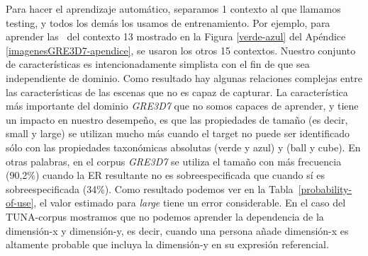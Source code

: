 Para hacer el aprendizaje autom\'atico, separamos 1 contexto al que llamamos testing, y todos los dem\'as los usamos de entrenamiento. Por ejemplo, para aprender las \puse\ del contexto 13 mostrado en la Figura \ref{verde-azul} del Ap\'endice \ref{imagenesGRE3D7-apendice}, se usaron los otros 15 contextos.
Nuestro conjunto de caracter\'{i}sticas es intencionadamente simplista con el fin de que sea
independiente de dominio. Como resultado hay algunas relaciones complejas
entre las caracter\'{i}sticas de las escenas que no es capaz de
capturar. La caracter\'{i}stica m\'as importante del dominio \textit{GRE3D7}
que no somos capaces de aprender, y tiene un impacto en nuestro desempe\~no, es que
las propiedades de tama\~no (es decir, small y large) se utilizan mucho
m\'as cuando el target no puede ser identificado s\'olo con las propiedades taxon\'omicas absolutas 
(verde y azul) y (ball y cube). En otras palabras, en el corpus \textit{GRE3D7} se utiliza el tama\~no con m\'as frecuencia (90,2\%)
cuando la ER resultante no es sobreespecificada que cuando s\'i es sobreespecificada (34\%). 
Como resultado podemos ver en la Tabla~\ref{probability-of-use}, el valor estimado para 
\emph{large} tiene un error considerable. En el caso del TUNA-corpus
  mostramos que no podemos aprender la dependencia de la dimensi\'on-x y
  dimensi\'on-y, es decir, cuando una persona a\~nade dimensi\'on-x es altamente
  probable que incluya la dimensi\'on-y en su expresi\'on referencial.





